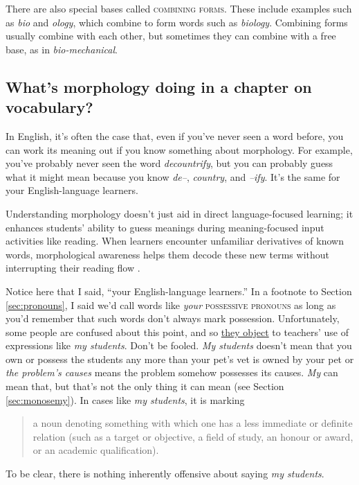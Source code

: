 There are also special bases called \textsc{combining forms}. These include examples such as \textit{bio} and \textit{ology}, which combine to form words such as \textit{biology}. Combining forms usually combine with each other, but sometimes they can combine with a free base, as in \textit{bio-mechanical}.

\subsection{What's morphology doing in a chapter on vocabulary?}

In English, it's often the case that, even if you've never seen a word before, you can work its meaning out if you know something about morphology. For example, you've probably never seen the word \textit{decountrify}, but you can probably guess what it might mean because you know \textit{de--}, \textit{country}, and \textit{--ify}. It's the same for your English-language learners.

Understanding morphology doesn't just aid in direct language-focused learning; it enhances students' ability to guess meanings during meaning-focused input activities like reading. When learners encounter unfamiliar derivatives of known words, morphological awareness helps them decode these new terms without interrupting their reading flow \citep{Nation2022}.

\begin{tcolorbox}[title=Self-check, colback=white]

    Notice here that I said, ``your English-language learners.'' In a footnote to Section \ref{sec:pronouns}, I said we'd call words like \textit{your} \textsc{possessive pronouns} as long as you'd remember that such words don't always mark possession. Unfortunately, some people are confused about this point, and so \href{https://twitter.com/search?q=%22my%20students%22%20possessive&src=typed_query&f=top}{they object} to teachers' use of expressions like \textit{my students}. Don't be fooled. \textit{My students} doesn't mean that you own or possess the students any more than your pet's vet is owned by your pet or \textit{the problem's causes} means the problem somehow possesses its causes. \textit{My} can mean that, but that's not the only thing it can mean (see Section \ref{sec:monosemy}). In cases like \textit{my students}, it is marking 
    
    \begin{quote}
        a noun denoting something with which one has a less immediate or definite relation (such as a target or objective, a field of study, an honour or award, or an academic qualification).\hfill\citep{oed_my}
    \end{quote}
            
    To be clear, there is nothing inherently offensive about saying \textit{my students}.
\end{tcolorbox}

